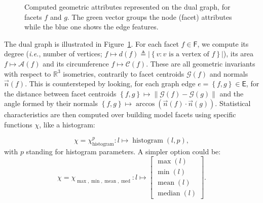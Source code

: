         \begin{figure}[htbp]
            \centering
            
            \caption{
                \label{fig::geometric_features}
                Computed geometric attributes represented on the dual graph, for facets $f$ and $g$.
                The green vector groups the node (facet) attributes while the blue one shows the edge features.
            }
        \end{figure}

        The dual graph is illustrated in Figure~\ref{fig::geometric_features}.
        For each facet $f \in \mathsf{F}$, we compute its degree (\textit{i.e.}, number of vertices; $f \mapsto d\left(f\right) \triangleq \left\lvert\left\{v : v\text{ is a vertex of }f\right\}\right\rvert$), its area $f \mapsto \mathscr{A}\left(f\right)$ and its circumference $f \mapsto \mathscr{C}\left(f\right)$.
        These are all geometric invariants with respect to $\mathbb{R}^3$ isometries, contrarily to facet centroids $\mathscr{G}\left(f\right)$ and normals $\vec{n}\left(f\right)$.
        This is countersteped by looking, for each graph edge $e=\left\{f, g\right\} \in \mathsf{E}$, for the distance between facet centroids $\left\{f, g\right\} \mapsto \left\lVert \mathscr{G}\left(f\right) - \mathscr{G}\left(g\right) \right\rVert$ and the angle formed by their normals $\left\{f, g\right\} \mapsto \arccos\left(\vec{n}\left(f\right) \cdot \vec{n}\left(g\right)\right)$.
        Statistical characteristics are then computed over building model facets using specific functions \(\chi\), like a histogram:        

        \begin{equation}
            \label{eq::histogram_extractor}
        	\chi = \chi^p_{\operatorname{histogram}}: l \mapsto \operatorname{histogram}(l, p),
        \end{equation}
        with $p$ standing for histogram parameters. A simpler option could be:
        \begin{equation}
            \label{eq::max_min_mean_med_extractor}
            \chi = \chi_{\max,\min,\operatorname{mean},\operatorname{med}}: l \mapsto \begin{bmatrix}
                \max(l)\\
                \min(l)\\
                \operatorname{mean}(l)\\
                \operatorname{median}(l)
            \end{bmatrix}.
        \end{equation}

